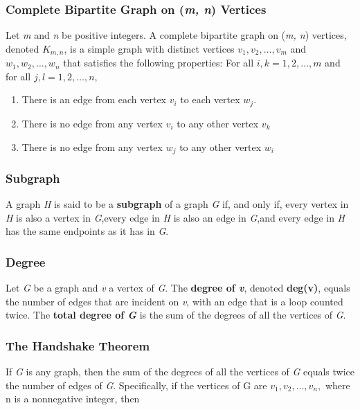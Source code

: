 \documentclass{article}
\begin{document}
\subsubsection{Complete Bipartite Graph on (\textit{m, n}) Vertices}
Let \textit{m} and \textit{n} be positive integers. A complete bipartite graph on (\textit{m, n}) vertices, denoted $K_{m,n}$, is a simple graph with distinct vertices $v_1, v_2, \ldots , v_m$ and $w_1, w_2, \ldots , w_n$ that satisfies the following properties: For all $i, k = 1, 2, \ldots, m$ and for all $j, l = 1, 2, \ldots, n,$

\begin{enumerate}
\item There is an edge from each vertex $v_i$ to each vertex $w_j$.
\item There is no edge from any vertex $v_i$ to any other vertex $v_k$
\item There is no edge from any vertex $w_j$ to any other vertex $w_i$
\end{enumerate}

\subsubsection{Subgraph}
A graph \textit{H} is said to be a \textbf{subgraph} of a graph \textit{G} if, and only if, every vertex in \textit{H} is also a vertex in \textit{G},every edge in \textit{H} is also an edge in \textit{G},and every edge in \textit{H} has the same endpoints as it has in \textit{G}.

\subsubsection{Degree}
Let \textit{G} be a graph and \textit{v} a vertex of \textit{G}. The \textbf{degree of \textit{v}}, denoted \textbf{deg(v)}, equals the number of edges that are incident on \textit{v}, with an edge that is a loop counted twice. The \textbf{total degree of \textit{G}} is the sum of the degrees of all the vertices of \textit{G}.

\subsubsection{The Handshake Theorem}
If \textit{G} is any graph, then the sum of the degrees of all the vertices of \textit{G} equals twice the number of edges of \textit{G}. Specifically, if the vertices of G are $v_1, v_2, \ldots, v_n,$ where n is a nonnegative integer, then
\end{document}
